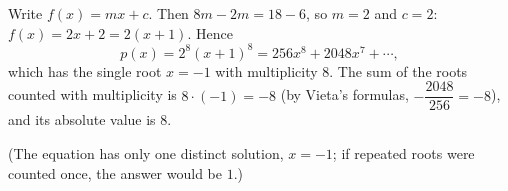 Write $f(x)=mx+c$. Then $8m-2m=18-6$, so $m=2$ and $c=2$: $f(x)=2x+2=2(x+1)$. Hence
\[p(x)=2^8(x+1)^8=256x^8+2048x^7+\cdots,\]
which has the single root $x=-1$ with multiplicity $8$. The sum of the roots counted with multiplicity is $8\cdot(-1)=-8$ (by Vieta's formulas, $-\dfrac{2048}{256}=-8$), and its absolute value is $\boxed{8}$.

(The equation has only one distinct solution, $x=-1$; if repeated roots were counted once, the answer would be $1$.)
